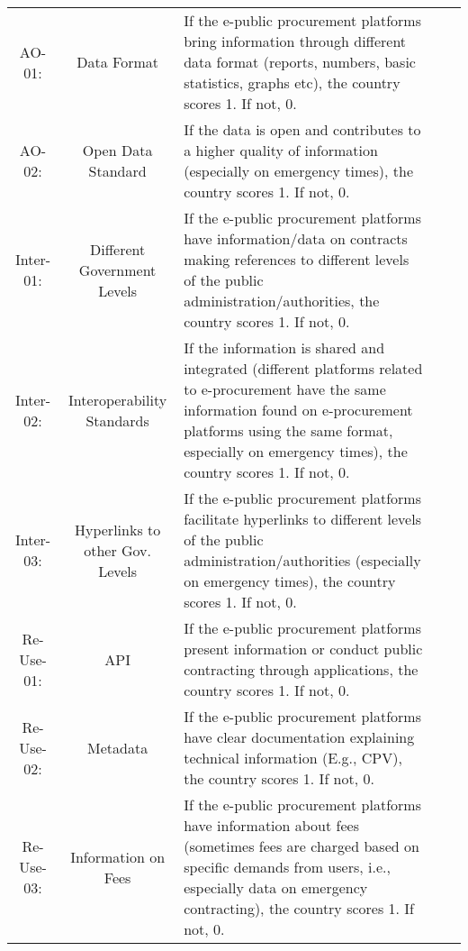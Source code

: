 \documentclass[a4paper, twoside]{report}
\begin{document}
\begin{table}[htbp]
\begin{adjustbox}{max width=\linewidth}
\begin{tabular}{ccp{30em}p{35em}p{31.335em}}
    \midrule
    AO-01: & Data Format & If the e-public procurement platforms bring information through different data format (reports, numbers, basic statistics, graphs etc), the country scores 1. If not, 0. \\
    AO-02: & \cellcolor[rgb]{ .749,  .749,  .749}Open Data Standard & \cellcolor[rgb]{ .749,  .749,  .749}If the data is open and contributes to a higher quality of information (especially on emergency times), the country scores 1. If not, 0.  \\
    \midrule
    Inter-01: & Different Government Levels & If the e-public procurement platforms have information/data on contracts making references to different levels of the public administration/authorities, the country scores 1. If not, 0. \\
    Inter-02: & \cellcolor[rgb]{ .749,  .749,  .749}Interoperability Standards & \cellcolor[rgb]{ .749,  .749,  .749}If the information is shared and integrated (different platforms related to e-procurement have the same information found on e-procurement platforms using the same format, especially on emergency times), the country scores 1. If not, 0.  \\
    Inter-03: & \cellcolor[rgb]{ .749,  .749,  .749}Hyperlinks to other Gov. Levels & \cellcolor[rgb]{ .749,  .749,  .749}If the e-public procurement platforms facilitate hyperlinks to different levels of the public administration/authorities (especially on emergency times), the country scores 1. If not, 0. \\
    \midrule
    Re-Use-01: & API   & If the e-public procurement platforms present information or conduct public contracting through applications, the country scores 1. If not, 0. \\
    Re-Use-02: & Metadata & If the e-public procurement platforms have clear documentation explaining technical information (E.g., CPV), the country scores 1. If not, 0.   \\
    Re-Use-03: & Information on Fees & If the e-public procurement platforms have information about fees (sometimes fees are charged based on specific demands from users, i.e., especially data on emergency contracting), the country scores 1. If not, 0.  \\
    \bottomrule
    \end{tabular}%
    \end{adjustbox}
  \label{tab:definitions3}%
\end{table}%
\end{document}
